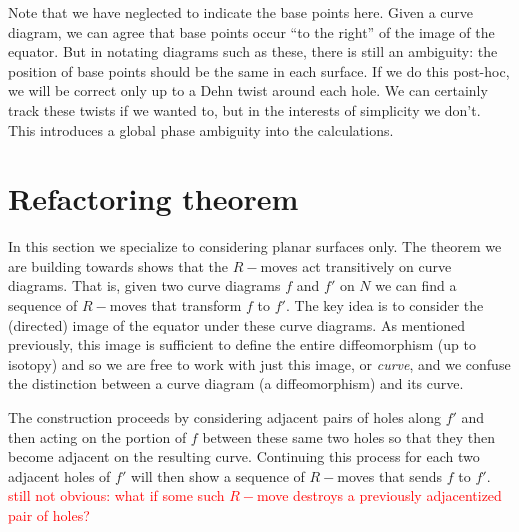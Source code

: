 \documentclass[aps, prl, letterpaper, twocolumn, superscriptaddress, notitlepage, 10pt]{revtex4-1}
\newcommand{\simon}[1]{\textcolor{red}{#1}}
\begin{document}
Note that we have neglected to indicate the base points here.
Given a curve diagram, we can agree that base points
occur ``to the right'' of the image of the equator.
But in notating diagrams such as these, there is still
an ambiguity: the position of base points should be the
same in each surface.
If we do this post-hoc, we will be correct
only up to a Dehn twist around each hole.
We can certainly track these twists if we wanted to,
but in the interests of simplicity we don't.
This introduces a global phase ambiguity into the
calculations.

\section{Refactoring theorem}

In this section we specialize to considering planar 
surfaces only.
The theorem we are building towards shows that
the $R-$moves act transitively on curve diagrams.
That is, given two curve diagrams $f$ and $f'$ on $N$ we can find
a sequence of $R-$moves that transform $f$ to $f'.$
The key idea is to consider the (directed) image of the equator under
these curve diagrams.
As mentioned previously, this image is sufficient to
define the entire diffeomorphism (up to isotopy) and so we are free
to work with just this image, or \emph{curve},
and we confuse the distinction between 
a curve diagram (a diffeomorphism)
and its curve.

The construction proceeds by considering adjacent
pairs of holes along $f'$ and then acting on the
portion of $f$ between these same two holes so that
they then become adjacent on the resulting curve.
Continuing this
process for each two adjacent holes of $f'$ will then
show a sequence of $R-$moves that sends $f$ to $f'.$
\simon{still not obvious: what if some such $R-$move
destroys a previously adjacentized pair of holes?}
\end{document}
